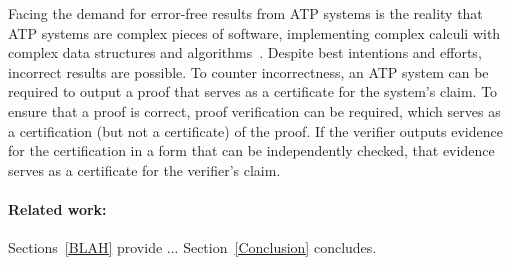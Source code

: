 \documentclass[runningheads]{llncs}
\begin{document}
Facing the demand for error-free results from ATP systems is the reality that ATP systems
are complex pieces of software, implementing complex calculi with complex data structures and
algorithms~\cite{Sch06}. 
Despite best intentions and efforts, incorrect results are possible.
To counter incorrectness, an ATP system can be required to output a proof
that serves as a certificate for the system's claim.
To ensure that a 
proof is correct, proof verification can be required, 
which serves as a certification (but not a certificate) of the proof.
If the verifier outputs evidence for the certification in a form that can be independently checked,
that evidence serves as a certificate for the verifier's claim.
%  

\paragraph{Related work:}

Sections~\ref{BLAH} provide ...
Section~\ref{Conclusion} concludes.
\end{document}

